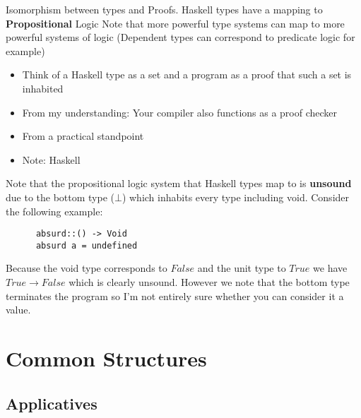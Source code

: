 \documentclass{article}
\begin{document}
Isomorphism between types and Proofs. Haskell types have a mapping to \textbf{Propositional} Logic
Note that more powerful type systems can map to more powerful systems of logic (Dependent types can
correspond to predicate logic for example)
\begin{itemize}
  \item Think of a Haskell type as a set and a program as a proof that such a set is inhabited
  \item From my understanding: Your compiler also functions as a proof checker
  \item From a practical standpoint
  \item Note: Haskell
\end{itemize}
     Note that the propositional logic system that Haskell types map to is \textbf{unsound}
     due to the bottom type ($\bot$) which inhabits every type including void. Consider the
     following example:
    \begin{verbatim}
      absurd::() -> Void
      absurd a = undefined
    \end{verbatim}
      Because the void type corresponds to $False$ and the unit type to $True$
      we have $True \rightarrow False$ which is clearly unsound. However we note
      that the bottom type terminates the program so I'm not entirely sure whether
      you can consider it a value.


\section{Common Structures}
\subsection{Applicatives}
\end{document}
